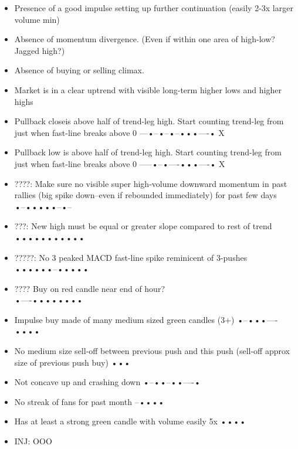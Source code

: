 \documentclass{../notes}
\begin{document}
\begin{itemize}
  \item Presence of a good impulse setting up further continuation (easily 2-3x larger volume min) \\
  \item Absence of momentum divergence. (Even if within one area of high-low? Jagged high?)
  \item Absence of buying or selling climax.
  \item Market is in a clear uptrend with visible long-term higher lows and higher highs

  \item Pullback closeis above half of trend-leg high. Start counting trend-leg from just when fast-line breaks above 0
        ---•--•--•--•••----•
        X
  \item Pullback low is above half of trend-leg high. Start counting trend-leg from just when fast-line breaks above 0
        -----•--•----•••----•
        X
  \item ????: Make sure no visible super high-volume downward momentum in past rallies (big spike down--even if rebounded immediately) for past few days \\
        •--•••••--•--
  \item ???: New high must be equal or greater slope compared to rest of trend\\
        •••••••••••
  \item ?????: No 3 peaked MACD fast-line spike reminicent of 3-pushes\\
        ••••••--•••••
  \item ???? Buy on red candle near end of hour?\\
        •----••••••••
  \item Impulse buy made of many medium sized green candles (3+)
        •--•••----••••
  \item No medium size sell-off between previous push and this push (sell-off approx size of previous push buy)
        •••
  \item Not concave up and crashing down
        •--••--••----•
  \item No streak of fans for past month
        --••••
  \item Has at least a strong green candle with volume easily 5x
        ••••
  \item INJ: OOO




\end{itemize}
\end{document}

